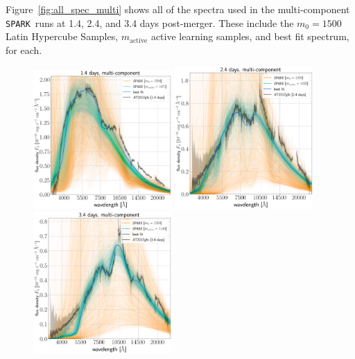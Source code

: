 \documentclass[twocolumn, twocolappendix]{aastex63}
\def\SPARK{\texttt{SPARK}}
\begin{document}
Figure~\ref{fig:all_spec_multi} shows all of the spectra used in the multi-component \SPARK~runs at 1.4, 2.4, and 3.4 days post-merger. These include the $m_0 = 1500$ Latin Hypercube Samples, $m_{\mathrm{active}}$ active learning samples, and best fit spectrum, for each.

\begin{figure}[!ht]
    \centering
    \includegraphics[width=0.47\textwidth]{figs/appendix/230412_040127_single_all_TARDIS_evals_mactive-1471_m0-1500.png}
    \includegraphics[width=0.47\textwidth]{figs/appendix/230412_035244_single_all_TARDIS_evals_mactive-1020_m0-1500.png}
    \includegraphics[width=0.47\textwidth]{figs/appendix/230626_073230_single_all_TARDIS_evals_mactive-1140_m0-1500.png}

\end{figure}
\end{document}
